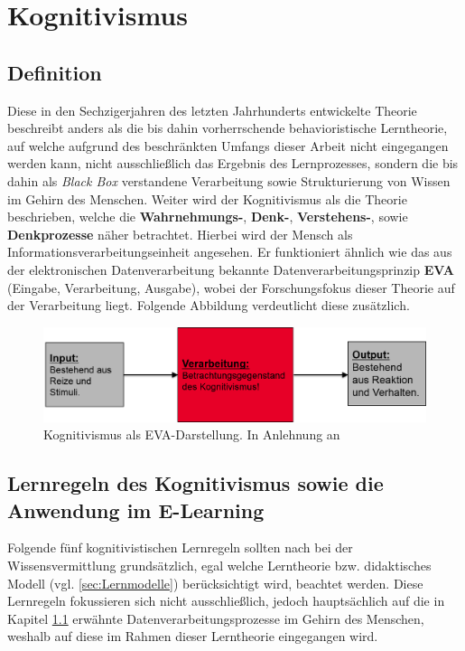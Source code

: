 \chapter{Kognitivismus}
\label{cha:Kognitivismus}

\section{Definition}\label{Definition Kognitivismus} %
Diese in den Sechzigerjahren des letzten Jahrhunderts entwickelte Theorie beschreibt anders als die bis dahin vorherrschende behavioristische Lerntheorie, auf welche aufgrund des beschränkten Umfangs dieser Arbeit nicht eingegangen werden kann, nicht ausschließlich das Ergebnis des Lernprozesses, sondern die bis dahin als \emph{Black Box} verstandene Verarbeitung sowie Strukturierung von Wissen im Gehirn des Menschen. \cite[S. 155]{Erpenbeck.2007} 
Weiter wird der Kognitivismus als die Theorie beschrieben, welche die \textbf{Wahrnehmungs-}, \textbf{Denk-}, \textbf{Verstehens-}, sowie \textbf{Denkprozesse} näher betrachtet. Hierbei wird der Mensch als Informationsverarbeitungseinheit angesehen. Er funktioniert ähnlich wie das aus der elektronischen Datenverarbeitung bekannte Datenverarbeitungsprinzip \textbf{EVA} (Eingabe, Verarbeitung, Ausgabe), wobei der Forschungsfokus dieser Theorie auf der Verarbeitung liegt. Folgende Abbildung verdeutlicht diese zusätzlich. \cite{AnsgarA.PlassmannProf.Dr.GunterSchmitt.2007}

\begin{figure}[h]
	\centering
	\includegraphics[width=1.0\textwidth]{Abbildungen/Kognitivismus1.PNG}
	\caption{Kognitivismus als EVA-Darstellung. In Anlehnung an \cite[S. 12]{SusanneMeir.}}
	\label{fig:Kognitivismusdarstellung}
\end{figure}

\section{Lernregeln des Kognitivismus sowie die Anwendung im E-Learning}
Folgende fünf kognitivistischen Lernregeln sollten nach \cite{Vontobel.2006} bei der Wissensvermittlung grundsätzlich, egal welche Lerntheorie bzw. didaktisches Modell (vgl. \ref{sec:Lernmodelle}) berücksichtigt wird, beachtet werden. Diese Lernregeln fokussieren sich nicht ausschließlich, jedoch hauptsächlich auf die in Kapitel \ref{Definition Kognitivismus} erwähnte Datenverarbeitungsprozesse im Gehirn des Menschen, weshalb auf diese im Rahmen dieser Lerntheorie eingegangen wird.\cite[S. 10]{Vontobel.2006}

